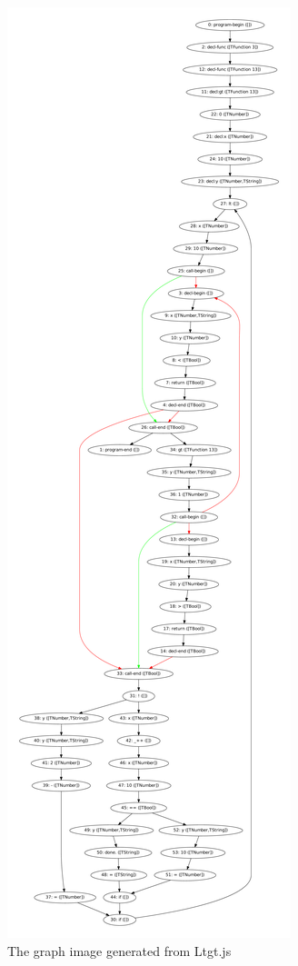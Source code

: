\documentclass[a4paper,10pt]{article}
\begin{document}
\begin{figure}
\begin{center}
 	\includegraphics[height=\textheight]{../examples/ltgt.pdf}
 	\caption{The graph image generated from Ltgt.js}
 	\label{ltgtGraph}
	\end{center}
 \end{figure}
\end{document}
